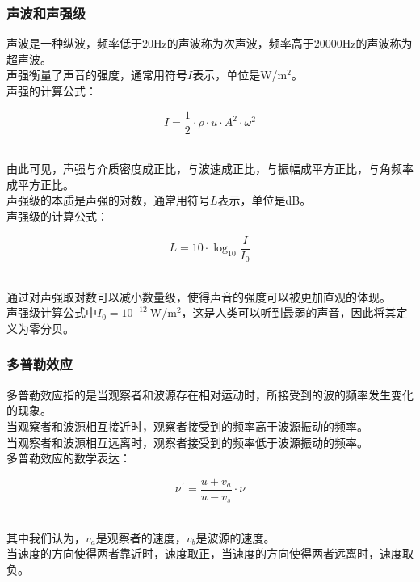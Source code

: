 \documentclass[UTF8]{ctexart}
\begin{document}
\newpage

\subsubsection{声波和声强级}
    声波是一种纵波，频率低于$20$Hz的声波称为次声波，频率高于$20000$Hz的声波称为超声波。\\[3mm]
    声强衡量了声音的强度，通常用符号$I$表示，单位是W/m$^2$。\\[3mm]
    声强的计算公式：
    \begin{large}
        \begin{equation*}
            I=\frac{1}{2}\cdot\rho\cdot u\cdot A^2\cdot\omega^2
        \end{equation*}
    \end{large}\\
    由此可见，声强与介质密度成正比，与波速成正比，与振幅成平方正比，与角频率成平方正比。\\[5mm]
    声强级的本质是声强的对数，通常用符号$L$表示，单位是dB。\\[3mm]
    声强级的计算公式：
    \begin{large}
        \begin{equation*}
            L=10\cdot\log_{10}{\frac{I}{I_0}}
        \end{equation*}
    \end{large}\\
    通过对声强取对数可以减小数量级，使得声音的强度可以被更加直观的体现。\\[3mm]
    声强级计算公式中$I_0=10^{-12}~$W/m$^2$，这是人类可以听到最弱的声音，因此将其定义为零分贝。

\subsubsection{多普勒效应}
    多普勒效应指的是当观察者和波源存在相对运动时，所接受到的波的频率发生变化的现象。\\[3mm]
    当观察者和波源相互接近时，观察者接受到的频率高于波源振动的频率。\\[2mm]
    当观察者和波源相互远离时，观察者接受到的频率低于波源振动的频率。\\[3mm]
    多普勒效应的数学表达：
    \begin{large}
        \begin{equation*}
            \nu^{\,'}=\frac{u+v_a}{u-v_s}\cdot\nu
        \end{equation*}
    \end{large}\\
    其中我们认为，$v_a$是观察者的速度，$v_b$是波源的速度。\\[3mm]
    当速度的方向使得两者靠近时，速度取正，当速度的方向使得两者远离时，速度取负。
\newpage
\end{document}
